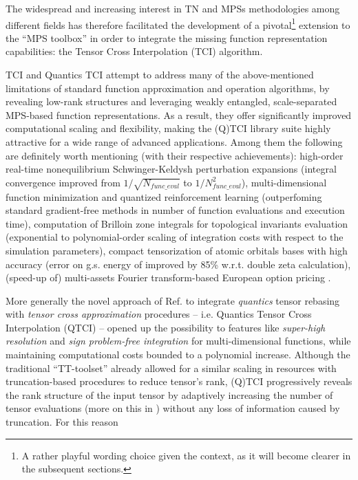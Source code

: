 The widespread and increasing interest in TN and MPSs methodologies among different fields has therefore facilitated the development of a pivotal\footnote{A rather playful wording choice given the context, as it will become clearer in the subsequent sections.} extension to the ``MPS toolbox'' in order to integrate the missing function representation capabilities: the Tensor Cross Interpolation (TCI) algorithm.

TCI and Quantics TCI attempt to address many of the above-mentioned limitations of standard function approximation and operation algorithms, by revealing low-rank structures and leveraging weakly entangled, scale-separated MPS-based function representations. As a result, they offer significantly improved computational scaling and flexibility, making the (Q)TCI library suite \cite{Fernandez2024} highly attractive for a wide range of advanced applications. Among them the following are definitely worth mentioning (with their respective achievements): high-order real-time nonequilibrium Schwinger-Keldysh perturbation expansions \cite{Fernandez2022} (integral convergence improved from $1/\sqrt{N_{func\_eval}}$ to $1/N_{func\_eval}^2$), multi-dimensional function minimization and quantized reinforcement learning \cite{Sozykin2022} (outperfoming standard gradient-free methods in number of function evaluations and execution time), computation of Brilloin zone integrals for topological invariants evaluation \cite{Ritter2024} (exponential to polynomial-order scaling of integration costs with respect to the simulation parameters), compact tensorization of atomic orbitals bases with high accuracy \cite{Jolly2024} (error on g.s. energy of  improved by 85\% w.r.t. double zeta calculation), (speed-up of) multi-assets Fourier transform-based European option pricing \cite{Sakurai2025}.

More generally the novel approach of Ref. \cite{Fernandez2022, Fernandez2024} to integrate \textit{quantics} tensor rebasing with \textit{tensor cross approximation} procedures -- i.e. Quantics Tensor Cross Interpolation (QTCI) -- opened up the possibility to features like \textit{super-high resolution} and \textit{sign problem-free integration} for multi-dimensional functions, while maintaining computational costs bounded to a polynomial increase. Although the traditional ``TT-toolset'' already allowed for a similar scaling in resources with truncation-based procedures to reduce tensor's rank, (Q)TCI progressively reveals the rank structure of the input tensor by adaptively increasing the number of tensor evaluations (more on this in ) without any loss of information caused by truncation. For this reason 


